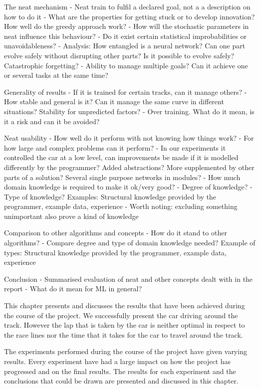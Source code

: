 The neat mechanism
- Neat train to fulfil a declared goal, not a a description on how to do it
- What are the properties for getting stuck or to develop innovation? How well do the greedy approach work?
- How will the stochastic parameters in neat influence this behaviour?
- Do it exist certain statistical improbabilities or unavoidableness?
- Analysis: How entangled is a neural network? Can one part evolve safely without disrupting other parts? Is it possible to evolve safely? Catastrophic forgetting?
- Ability to manage multiple goals? Can it achieve one or several tasks at the same time?


Generality of results
- If it is trained for certain tracks, can it manage others?
- How stable and general is it? Can it manage the same curve in different situations? Stability for unpredicted factors?
- Over training. What do it mean, is it a risk and can it be avoided?


Neat usability
- How well do it perform with not knowing how things work?
- For how large and complex problems can it perform?
- In our experiments it controlled the car at a low level, can improvements be made if it is modelled differently by the programmer? Added abstractions? More supplemented by other parts of a solution? Several single purpose networks in modules?
- How much domain knowledge is required to make it ok/very good?
  - Degree of knowledge?
  - Type of knowledge? Examples: Structural knowledge provided by the programmer, example data, experience
  - Worth noting: excluding something unimportant also prove a kind of knowledge


Comparison to other algorithms and concepts
- How do it stand to other algorithms?
- Compare degree and type of domain knowledge needed? Example of types: Structural knowledge provided by the programmer, example data, experience


Conclusion
- Summarised evaluation of neat and other concepts dealt with in the report
- What do it mean for ML in general?



\iffalse

This chapter presents and discusses the results that have been achieved during the course of the project. We successfully present the car driving around the track. However the lap that is taken by the car is neither optimal in respect to the race lines nor the time that it takes for the car to travel around the track.

The experiments performed during the course of the project have given varying results. Every experiment have had a large impact on how the project has progressed and on the final results. The results for each experiment and the conclusions that could be drawn are presented and discussed in this chapter.

